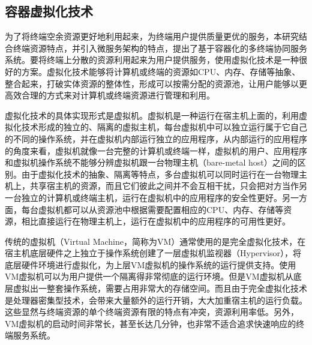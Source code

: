 \subsection{容器虚拟化技术}
为了将终端空余资源更好地利用起来，为终端用户提供质量更优的服务，本研究结合终端资源特点，并引入微服务架构的特点，提出了基于容器化的多终端协同服务系统。要将终端上分散的资源利用起来为用户提供服务，使用虚拟化技术是一种很好的方案。虚拟化技术能够将计算机或终端的资源如CPU、内存、存储等抽象、整合起来，打破实体资源的整体性，形成可以按需分配的资源池，让用户能够以更高效合理的方式来对计算机或终端资源进行管理和利用。

虚拟化技术的具体实现形式是虚拟机。虚拟机是一种运行在宿主机上面的，利用虚拟化技术形成的独立的、隔离的虚拟主机，每台虚拟机中可以独立运行属于它自己的不同的操作系统，并在虚拟机内部运行独立的应用程序，从内部运行的应用程序的角度来看，虚拟机就像一台完整的计算机或终端一样，虚拟机的用户、应用程序和虚拟机操作系统不能够分辨虚拟机跟一台物理主机（bare-metal host）之间的区别。由于虚拟化技术的抽象、隔离等特点，多台虚拟机可以同时运行在一台物理主机上，共享宿主机的资源，而且它们彼此之间并不会互相干扰，只会把对方当作另一台独立的计算机或终端主机，运行在虚拟机中的应用程序的安全性更好。另一方面，每台虚拟机都可以从资源池中根据需要配置相应的CPU、内存、存储等资源，相比直接运行在物理主机上，运行在虚拟机中的应用程序的可用性更好。

传统的虚拟机（Virtual Machine，简称为VM）通常使用的是完全虚拟化技术，在宿主机底层硬件之上独立于操作系统创建了一层虚拟机监视器（Hypervisor），将底层硬件环境进行虚拟化，为上层VM虚拟机的操作系统的运行提供支持。使用VM虚拟机可以为用户提供一个隔离得非常彻底的运行环境。但是VM虚拟机从底层虚拟出一整套操作系统，需要占用非常大的存储空间。而且由于完全虚拟化技术是处理器密集型技术，会带来大量额外的运行开销，大大加重宿主机的运行负载。这些显然与终端资源的单个终端资源有限的特点有冲突，资源利用率低。另外，VM虚拟机的启动时间非常长，甚至长达几分钟，也非常不适合追求快速响应的终端服务系统。

